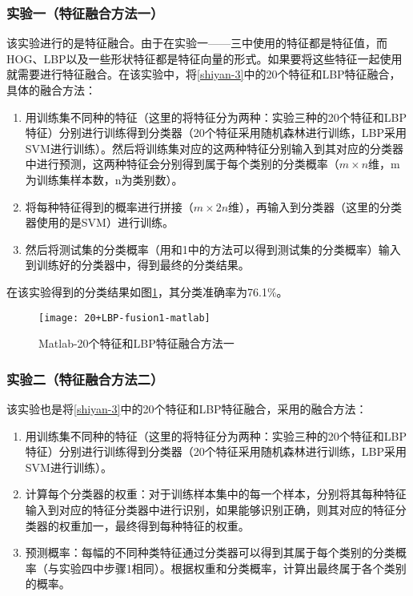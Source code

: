 \subsubsection{实验一（特征融合方法一）}
\label{ronghe1}
该实验进行的是特征融合。由于在实验一——三中使用的特征都是特征值，而HOG、LBP以及一些形状特征都是特征向量的形式。如果要将这些特征一起使用就需要进行特征融合。在该实验中，将\ref{shiyan-3}中的20个特征和LBP特征融合，具体的融合方法：
\begin{enumerate}
\item 用训练集不同种的特征（这里的将特征分为两种：实验三种的20个特征和LBP特征）分别进行训练得到分类器（20个特征采用随机森林进行训练，LBP采用SVM进行训练）。然后将训练集对应的这两种特征分别输入到其对应的分类器中进行预测，这两种特征会分别得到属于每个类别的分类概率（$m \times n$维，m为训练集样本数，n为类别数）。
\item 将每种特征得到的概率进行拼接（$m \times 2n$维），再输入到分类器（这里的分类器使用的是SVM）进行训练。
\item 然后将测试集的分类概率（用和1中的方法可以得到测试集的分类概率）输入到训练好的分类器中，得到最终的分类结果。
\end{enumerate}

在该实验得到的分类结果如图\ref{fig:20+LBP-fusion1-matlab}，其分类准确率为76.1\%。
\begin{figure}[!ht]
\centering
\texttt{[image: 20+LBP-fusion1-matlab]}
\caption{Matlab-20个特征和LBP特征融合方法一}
\label{fig:20+LBP-fusion1-matlab}
\end{figure}

\subsubsection{实验二（特征融合方法二）}
该实验也是将\ref{shiyan-3}中的20个特征和LBP特征融合，采用的融合方法：
\begin{enumerate}
\item 用训练集不同种的特征（这里的将特征分为两种：实验三种的20个特征和LBP特征）分别进行训练得到分类器（20个特征采用随机森林进行训练，LBP采用SVM进行训练）。
\item 计算每个分类器的权重：对于训练样本集中的每一个样本，分别将其每种特征输入到对应的特征分类器中进行识别，如果能够识别正确，则其对应的特征分类器的权重加一，最终得到每种特征的权重。
\item 预测概率：每幅的不同种类特征通过分类器可以得到其属于每个类别的分类概率（与实验四中步骤1相同）。根据权重和分类概率，计算出最终属于各个类别的概率。
\end{enumerate}

